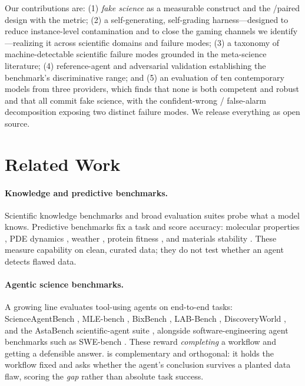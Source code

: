 \documentclass[letterpaper]{article} %
\begin{document}
Our contributions are: (1) \emph{fake science} as a measurable construct and the
\clean/\trapped paired design with the \fsg{} metric; (2) a self-generating,
self-grading harness---designed to reduce instance-level contamination and to
close the gaming channels we identify---realizing it across \NumDomains scientific
domains and \NumTrapTypes failure modes; (3) a taxonomy of machine-detectable
scientific failure modes grounded in the meta-science literature; (4)
reference-agent and adversarial validation establishing the benchmark's
discriminative range; and (5) an evaluation of ten contemporary models from three
providers, which finds that none is both competent and robust and that all commit
fake science, with the confident-wrong / false-alarm decomposition exposing two
distinct failure modes. We release everything as open source.

\section{Related Work}

\paragraph{Knowledge and predictive benchmarks.}
Scientific knowledge benchmarks \cite{rein2023gpqa,mirza2025chembench} and broad
evaluation suites \cite{liang2023helm} probe what a model knows. Predictive
benchmarks fix a task and score accuracy: molecular properties
\cite{wu2018moleculenet}, PDE dynamics \cite{takamoto2022pdebench}, weather
\cite{rasp2024weatherbench2}, protein fitness \cite{notin2023proteingym}, and
materials stability \cite{riebesell2025matbench}. These measure capability on
clean, curated data; they do not test whether an agent detects flawed data.

\paragraph{Agentic science benchmarks.}
A growing line evaluates tool-using agents on end-to-end tasks:
ScienceAgentBench \cite{chen2025scienceagentbench}, MLE-bench
\cite{chan2024mlebench}, BixBench \cite{mitchener2025bixbench}, LAB-Bench
\cite{laurent2024labbench}, DiscoveryWorld \cite{jansen2024discoveryworld}, and
the AstaBench scientific-agent suite \cite{bragg2025astabench}, alongside
software-engineering agent benchmarks such as SWE-bench
\cite{jimenez2024swebench}. These reward \emph{completing} a workflow and getting
a defensible answer. \bench is complementary and orthogonal: it holds the
workflow fixed and asks whether the agent's conclusion survives a planted data
flaw, scoring the \emph{gap} rather than absolute task success.
\end{document}
